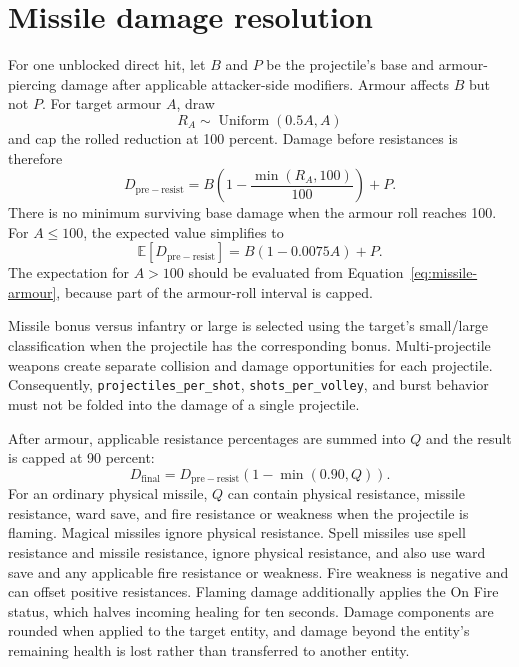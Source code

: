 \documentclass[11pt]{article}
\begin{document}
\section{Missile damage resolution}

For one unblocked direct hit, let $B$ and $P$ be the projectile's base and
armour-piercing damage after applicable attacker-side modifiers.  Armour
affects $B$ but not $P$.  For target armour $A$, draw
\begin{equation}
  R_A \sim \operatorname{Uniform}(0.5A,A)
\end{equation}
and cap the rolled reduction at 100 percent.  Damage before resistances is
therefore
\begin{equation}
  D_{\mathrm{pre-resist}}
  = B\left(1-\frac{\min(R_A,100)}{100}\right)+P.
  \label{eq:missile-armour}
\end{equation}
There is no minimum surviving base damage when the armour roll reaches 100.
For $A\leq100$, the expected value simplifies to
\begin{equation}
  \mathbb{E}[D_{\mathrm{pre-resist}}]
  = B(1-0.0075A)+P.
  \label{eq:missile-armour-expectation}
\end{equation}
The expectation for $A>100$ should be evaluated from
Equation~\ref{eq:missile-armour}, because part of the armour-roll interval is
capped.

Missile bonus versus infantry or large is selected using the target's
small/large classification when the projectile has the corresponding bonus.
Multi-projectile weapons create separate collision and damage opportunities
for each projectile.  Consequently,
\texttt{projectiles\_\allowbreak per\_\allowbreak shot},
\texttt{shots\_\allowbreak per\_\allowbreak volley}, and burst behavior must not be folded into the
damage of a single projectile.

After armour, applicable resistance percentages are summed into $Q$ and the
result is capped at 90 percent:
\begin{equation}
  D_{\mathrm{final}}
  = D_{\mathrm{pre-resist}}
    \left(1-\min(0.90,Q)\right).
  \label{eq:missile-resistance}
\end{equation}
For an ordinary physical missile, $Q$ can contain physical resistance,
missile resistance, ward save, and fire resistance or weakness when the
projectile is flaming.  Magical missiles ignore physical resistance.  Spell
missiles use spell resistance and missile resistance, ignore physical
resistance, and also use ward save and any applicable fire resistance or
weakness.  Fire weakness is negative and can offset positive resistances.
Flaming damage additionally applies the On Fire status, which halves incoming
healing for ten seconds.  Damage components are rounded when applied to the
target entity, and damage beyond the entity's remaining health is lost rather
than transferred to another entity.
\end{document}
